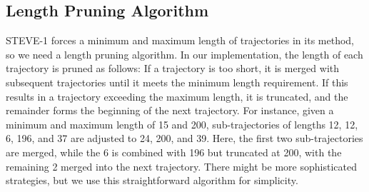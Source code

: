 \subsection{Length Pruning Algorithm}
\label{app: prune}
STEVE-1 forces a minimum and maximum length of trajectories in its method, so we need a length pruning algorithm. In our implementation, the length of each trajectory is pruned as follows: If a trajectory is too short, it is merged with subsequent trajectories until it meets the minimum length requirement. If this results in a trajectory exceeding the maximum length, it is truncated, and the remainder forms the beginning of the next trajectory. For instance, given a minimum and maximum length of 15 and 200, sub-trajectories of lengths 12, 12, 6, 196, and 37 are adjusted to 24, 200, and 39. Here, the first two sub-trajectories are merged, while the 6 is combined with 196 but truncated at 200, with the remaining 2 merged into the next trajectory. There might be more sophisticated strategies, but we use this straightforward algorithm for simplicity.

